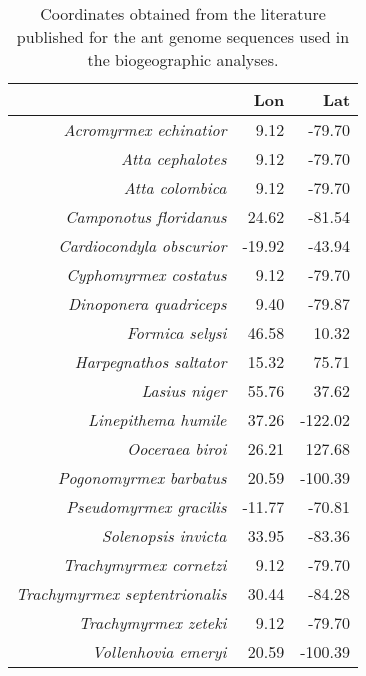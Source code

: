 \begin{table}[ht]
\centering
\begin{tabular}{rrr}
  \hline
 & Lon & Lat \\ 
  \hline
{\emph{Acromyrmex echinatior}} & 9.12 & -79.70 \\ 
  {\emph{Atta cephalotes}} & 9.12 & -79.70 \\ 
  {\emph{Atta colombica}} & 9.12 & -79.70 \\ 
  {\emph{Camponotus floridanus}} & 24.62 & -81.54 \\ 
  {\emph{Cardiocondyla obscurior}} & -19.92 & -43.94 \\ 
  {\emph{Cyphomyrmex costatus}} & 9.12 & -79.70 \\ 
  {\emph{Dinoponera quadriceps}} & 9.40 & -79.87 \\ 
  {\emph{Formica selysi}} & 46.58 & 10.32 \\ 
  {\emph{Harpegnathos saltator}} & 15.32 & 75.71 \\ 
  {\emph{Lasius niger}} & 55.76 & 37.62 \\ 
  {\emph{Linepithema humile}} & 37.26 & -122.02 \\ 
  {\emph{Ooceraea biroi}} & 26.21 & 127.68 \\ 
  {\emph{Pogonomyrmex barbatus}} & 20.59 & -100.39 \\ 
  {\emph{Pseudomyrmex gracilis}} & -11.77 & -70.81 \\ 
  {\emph{Solenopsis invicta}} & 33.95 & -83.36 \\ 
  {\emph{Trachymyrmex cornetzi}} & 9.12 & -79.70 \\ 
  {\emph{Trachymyrmex septentrionalis}} & 30.44 & -84.28 \\ 
  {\emph{Trachymyrmex zeteki}} & 9.12 & -79.70 \\ 
  {\emph{Vollenhovia emeryi}} & 20.59 & -100.39 \\ 
   \hline
\end{tabular}
\caption{Coordinates obtained from the literature published for the ant genome sequences used in the biogeographic analyses.} 
\end{table}
